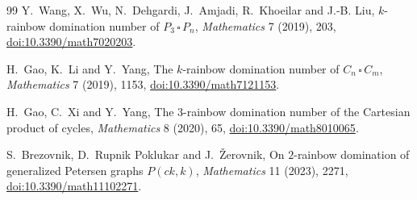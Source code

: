 \documentclass[11pt]{article}
\theoremstyle{definition}
\theoremstyle{remark}
\begin{document}
\begin{thebibliography}{99}
 Y.~Wang, X.~Wu, N.~Dehgardi, J.~Amjadi, R.~Khoeilar and J.-B. Liu,
$k$-rainbow domination number of $P_3\,\square\,P_n$, \emph{Mathematics} 7 (2019), 203,
\href{https://doi.org/10.3390/math7020203}{doi:10.3390/math7020203}.

 H.~Gao, K.~Li and Y.~Yang, The $k$-rainbow domination number of
$C_n\,\square\,C_m$, \emph{Mathematics} 7 (2019), 1153,
\href{https://doi.org/10.3390/math7121153}{doi:10.3390/math7121153}.

 H.~Gao, C.~Xi and Y.~Yang, The $3$-rainbow domination number of the Cartesian
product of cycles, \emph{Mathematics} 8 (2020), 65,
\href{https://doi.org/10.3390/math8010065}{doi:10.3390/math8010065}.

 S.~Brezovnik, D.~Rupnik Poklukar and J.~Žerovnik, On $2$-rainbow domination of
generalized Petersen graphs $P(ck,k)$, \emph{Mathematics} 11 (2023), 2271,
\href{https://doi.org/10.3390/math11102271}{doi:10.3390/math11102271}.

\end{thebibliography}
\end{document}
